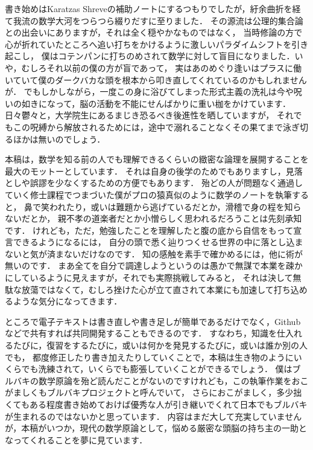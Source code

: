 
書き始めはKaratzas Shreveの補助ノートにするつもりでしたが，紆余曲折を経て我流の数学大河をつらつら綴りだすに至りました．
その源流は公理的集合論との出会いにありますが，それは全く穏やかなものではなく，
当時修論の方で心が折れていたところへ追い打ちをかけるように激しいパラダイムシフトを引き起こし，
僕はコテンパンに打ちのめされて数学に対して盲目になりました．いや，むしろそれ以前の僕の方が盲であって，
実はあのめぐり逢いはプラスに働いていて僕のダークバカな頭を根本から叩き直してくれているのかもしれませんが．
でもしかしながら，一度この身に浴びてしまった形式主義の洗礼は今や呪いの如きになって，脳の活動を不能にせんばかりに重い枷をかけています．
日々鬱々と，大学院生にあるまじき恐るべき後進性を晒していますが，
それでもこの呪縛から解放されるためには，途中で溺れることなくその果てまで泳ぎ切るほかは無いのでしょう．

本稿は，数学を知る前の人でも理解できるくらいの緻密な論理を展開することを最大のモットーとしています．
それは自身の後学のためでもありますし，見落としや誤謬を少なくするための方便でもあります．
殆どの人が問題なく通過していく修士課程でつまづいた僕がプロの猿真似のように数学のノートを執筆すると，
鼻で笑われたり，或いは難題から逃げているだとか，滑稽で身の程を知らないだとか，
親不孝の道楽者だとか小憎らしく思われるだろうことは先刻承知です．
けれども，ただ，勉強したことを理解したと腹の底から自信をもって宣言できるようになるには，
自分の頭で悉く辿りつくせる世界の中に落とし込まないと気が済まないだけなのです．
知の感触を素手で確かめるには，他に術が無いのです．
まあ全てを自分で調達しようというのは愚かで無謀で本業を疎かにしているように見えますが，それでも実際挑戦してみると，
それは決して無駄な放蕩ではなくて，むしろ挫けた心が立て直されて本業にも加速して打ち込めるような気分になってきます．

ところで電子テキストは書き直しや書き足しが簡単であるだけでなく，Githubなどで共有すれば共同開発することもできるのです．
すなわち，知識を仕入れるたびに，復習をするたびに，或いは何かを発見するたびに，或いは誰か別の人でも，
都度修正したり書き加えたりしていくことで，本稿は生き物のようにいくらでも洗練されて，いくらでも膨張していくことができるでしょう．
僕はブルバキの数学原論を殆ど読んだことがないのですけれども，この執筆作業をおこがましくもブルバキプロジェクトと呼んでいて，
さらにおこがましく，多少拙くてもある程度書き始めておけば優秀な人が引き継いでくれて日本でもブルバキが生まれるのではないかと思っています．
内容はまだ大して充実していませんが，本稿がいつか，現代の数学原論として，悩める厳密な頭脳の持ち主の一助となってくれることを夢に見ています．

